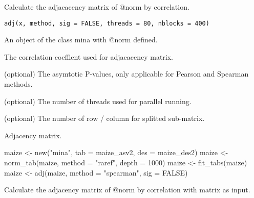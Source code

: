 \documentclass[a4paper]{book}
\begin{document}
%
\begin{Description}\relax
Calculate the adjacacency matrix of @norm by correlation.
\end{Description}
%
\begin{Usage}
\begin{verbatim}
adj(x, method, sig = FALSE, threads = 80, nblocks = 400)
\end{verbatim}
\end{Usage}
%
\begin{Arguments}
\begin{ldescription}
\item[\code{x}] An object of the class mina with @norm defined.

\item[\code{method}] The correlation coeffient used for adjacacency matrix.

\item[\code{sig}] (optional) The asymtotic P-values, only applicable for Pearson and
Spearman methods.

\item[\code{threads}] (optional) The number of threads used for parallel running.

\item[\code{nblocks}] (optional) The number of row / column for splitted sub-matrix.
\end{ldescription}
\end{Arguments}
%
\begin{Value}
Adjacency matrix.
\end{Value}
%
\begin{Examples}
\begin{ExampleCode}
maize <- new("mina", tab = maize_asv2, des = maize_des2)
maize <- norm_tab(maize, method = "raref", depth = 1000)
maize <- fit_tabs(maize)
maize <- adj(maize, method = "spearman", sig = FALSE)
\end{ExampleCode}
\end{Examples}
%
\begin{Description}\relax
Calculate the adjacency matrix of @norm by correlation with matrix as input.
\end{Description}
\end{document}
